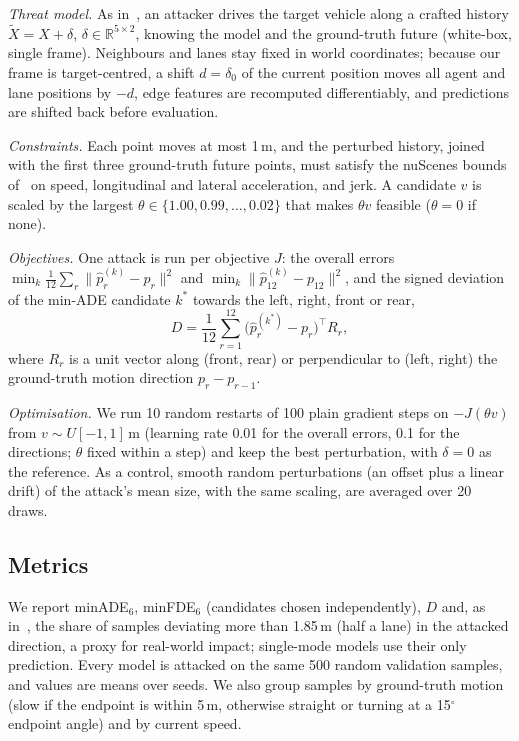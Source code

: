 \documentclass[conference]{IEEEtran}
\newcommand{\minade}{minADE$_6$}
\newcommand{\minfde}{minFDE$_6$}
\begin{document}
\textit{Threat model.} As in~\cite{zhang2022adversarial}, an attacker drives the target vehicle along a crafted history $\tilde X=X+\delta$, $\delta\in\mathbb{R}^{5\times2}$, knowing the model and the ground-truth future (white-box, single frame). Neighbours and lanes stay fixed in world coordinates; because our frame is target-centred, a shift $d=\delta_0$ of the current position moves all agent and lane positions by $-d$, edge features are recomputed differentiably, and predictions are shifted back before evaluation.

\textit{Constraints.} Each point moves at most 1\,m, and the perturbed history, joined with the first three ground-truth future points, must satisfy the nuScenes bounds of~\cite{zhang2022adversarial} on speed, longitudinal and lateral acceleration, and jerk. A candidate $v$ is scaled by the largest $\theta\in\{1.00,0.99,\ldots,0.02\}$ that makes $\theta v$ feasible ($\theta=0$ if none).

\textit{Objectives.} One attack is run per objective $J$: the overall errors $\min_k\frac{1}{12}\sum_r\lVert\hat p^{(k)}_r-p_r\rVert^2$ and $\min_k\lVert\hat p^{(k)}_{12}-p_{12}\rVert^2$, and the signed deviation of the min-ADE candidate $k^*$ towards the left, right, front or rear,
\begin{equation}
D=\frac{1}{12}\sum_{r=1}^{12}\big(\hat p^{(k^*)}_r-p_r\big)^\top R_r,
\end{equation}
where $R_r$ is a unit vector along (front, rear) or perpendicular to (left, right) the ground-truth motion direction $p_r-p_{r-1}$.

\textit{Optimisation.} We run 10 random restarts of 100 plain gradient steps on $-J(\theta v)$ from $v\sim U[-1,1]$\,m (learning rate 0.01 for the overall errors, 0.1 for the directions; $\theta$ fixed within a step) and keep the best perturbation, with $\delta=0$ as the reference. As a control, smooth random perturbations (an offset plus a linear drift) of the attack's mean size, with the same scaling, are averaged over 20 draws.

\subsection{Metrics}
We report \minade{}, \minfde{} (candidates chosen independently), $D$ and, as in~\cite{zhang2022adversarial}, the share of samples deviating more than 1.85\,m (half a lane) in the attacked direction, a proxy for real-world impact; single-mode models use their only prediction. Every model is attacked on the same 500 random validation samples, and values are means over seeds. We also group samples by ground-truth motion (slow if the endpoint is within 5\,m, otherwise straight or turning at a 15$^\circ$ endpoint angle) and by current speed.
\end{document}
